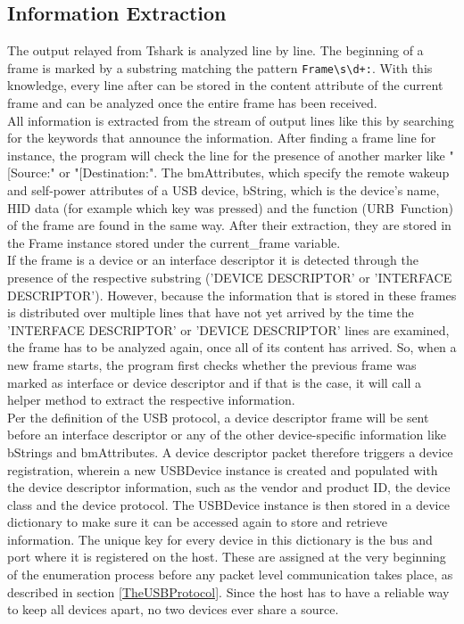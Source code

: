 \subsection{Information Extraction}

The output relayed from Tshark is analyzed line by line. The beginning of a frame is marked by a substring matching the pattern \verb|Frame\s\d+:|. With this knowledge, every line after can be stored in the content attribute of the current frame and can be analyzed once the entire frame has been received. \\ 
All information is extracted from the stream of output lines like this by searching for the keywords that announce the information. After finding a frame line for instance, the program will check the line for the presence of another marker like "[Source:" or "[Destination:". The bmAttributes, which specify the remote wakeup and self-power attributes of a USB device, bString, which is the device's name, HID data (for example which key was pressed) and the function (URB\ Function) of the frame are found in the same way. After their extraction, they are stored in the Frame instance stored under the current\_frame variable. \\
If the frame is a device or an interface descriptor it is detected through the presence of the respective substring ('DEVICE DESCRIPTOR' or 'INTERFACE DESCRIPTOR'). However, because the information that is stored in these frames is distributed over multiple lines that have not yet arrived by the time the 'INTERFACE DESCRIPTOR' or 'DEVICE DESCRIPTOR'  lines are examined, the frame has to be analyzed again, once all of its content has arrived. So, when a new frame starts, the program first checks whether the previous frame was marked as interface or device descriptor and if that is the case, it will call a helper method to extract the respective information. \\
Per the definition of the USB protocol, a device descriptor frame will be sent before an interface descriptor or any of the other device-specific information like bStrings and bmAttributes. A device descriptor packet therefore triggers a device registration, wherein a new USBDevice instance is created and populated with the device descriptor information, such as the vendor and product ID, the device class and the device protocol. The USBDevice instance is then stored in a device dictionary to make sure it can be accessed again to store and retrieve information. The unique key for every device in this dictionary is the bus and port where it is registered on the host. These are assigned at the very beginning of the enumeration process before any packet level communication takes place, as described in section \ref{TheUSBProtocol}. Since the host has to have a reliable way to keep all devices apart, no two devices ever share a source. \\
